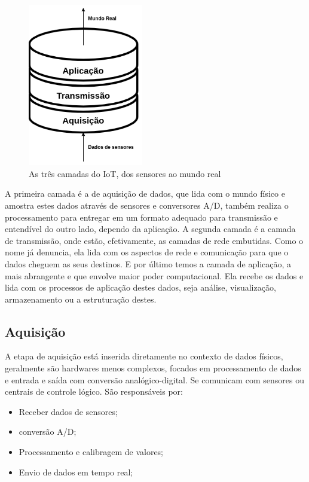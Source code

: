 \begin{figure}[h!]
\label{fig:1.1.0/camadas_iot}
\centering
\includegraphics[width=5cm]{./02_Capitulos/02_Cap1/figures/iot_stack}
\caption{As três camadas do IoT, dos sensores ao mundo real}
\end{figure}

A primeira camada é a de aquisição de dados, que lida com o mundo físico e amostra estes dados através de sensores e conversores A/D, também realiza o processamento para entregar em um formato adequado para transmissão e entendível do outro lado, dependo da aplicação. A segunda camada é a camada de transmissão, onde estão, efetivamente, as camadas de rede embutidas. Como o nome já denuncia, ela lida com os aspectos de rede e comunicação para que o dados cheguem as seus destinos. E por último temos a camada de aplicação, a mais abrangente e que envolve maior poder computacional. Ela recebe os dados e lida com os processos de aplicação destes dados, seja análise, visualização, armazenamento ou a estruturação destes.

\subsection{Aquisição}
\label{subsection:aquisicao}

A etapa de aquisição está inserida diretamente no contexto de dados físicos, geralmente são hardwares menos complexos, focados em processamento de dados e entrada e saída com conversão analógico-digital. Se comunicam com sensores ou centrais de controle lógico. São responsáveis por:

\begin{itemize}
	\item Receber dados de sensores;
	\item conversão A/D;
	\item Processamento e calibragem de valores;
	\item Envio de dados em tempo real;
\end{itemize} 

